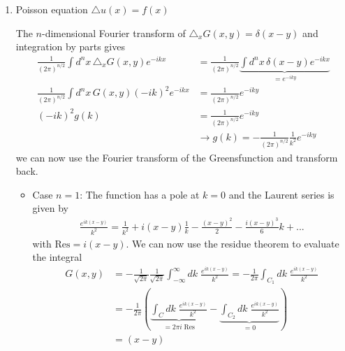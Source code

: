 \documentclass[10pt,a4paper]{article}
\theoremstyle{definition}
\begin{document}
    
\begin{enumerate}
    \item Poisson equation $\triangle u(x) = f(x)$
    
    The $n$-dimensional Fourier transform of $\triangle_x G(x,y) = \delta(x-y)$ and integration by parts gives
    \begin{align}
        \frac{1}{(2\pi)^{n/2}}\int d^nx\,\triangle_x G(x,y) e^{-ikx}&=\frac{1}{(2\pi)^{n/2}}\underbrace{\int d^nx\,\delta(x-y) e^{-ikx}}_{=e^{-iky}}\\
        \frac{1}{(2\pi)^{n/2}}\int d^nx\, G(x,y) (-ik)^2 e^{-ikx}&=\frac{1}{(2\pi)^{n/2}}e^{-iky}\\
        (-ik)^2g(k)&=\frac{1}{(2\pi)^{n/2}}e^{-iky}\\
        &\rightarrow g(k)=-\frac{1}{(2\pi)^{n/2}}\frac{1}{k^2}e^{-iky}
    \end{align}
    we can now use the Fourier transform of the Greensfunction and transform back.
    \begin{itemize}
        \item Case $n=1$: The function has a pole at $k=0$ and the Laurent series is given by
        \begin{align}
            \frac{e^{ik(x-y)}}{k^2}=\frac{1}{k^2}+i(x-y)\frac{1}{k}-\frac{(x-y)^2}{2}-\frac{i(x-y)^3}{6} k + ...
        \end{align}
        with $\text{Res}=i(x-y)$. We can now use the residue theorem to evaluate the integral
        \begin{align}
            G(x,y)&=-\frac{1}{\sqrt{2\pi}}\frac{1}{\sqrt{2\pi}}\int_{-\infty}^\infty dk\; \frac{e^{ik(x-y)}}{k^2}=-\frac{1}{2\pi}\int_{C_1} dk\; \frac{e^{ik(x-y)}}{k^2}\\
            &=-\frac{1}{2\pi}\left(\underbrace{\int_C dk\; \frac{e^{ik(x-y)}}{k^2}}_{=2\pi i\;\text{Res}} - \underbrace{\int_{C_2} dk\; \frac{e^{ik(x-y)}}{k^2}}_{=0}\right)\\
            &=(x-y)
        \end{align}
    
        \begin{center}
\end{center}
\end{itemize}
\end{enumerate}
\end{document}
